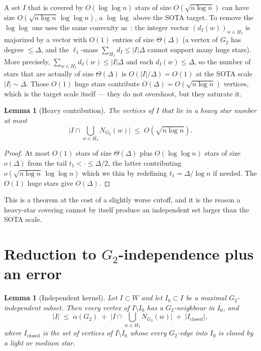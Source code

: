 \documentclass[11pt]{article}
\newtheorem{lemma}[theorem]{Lemma}
\theoremstyle{definition}
\begin{document}
A set $I$ that is covered by $O(\log\log n)$ stars of size $O(\sqrt{n\log n})$ can have size $O(\sqrt{n\log n}\,\log\log n)$, a $\log\log$ above the SOTA target.
To remove the $\log\log$ one uses the same convexity as~\cite[Lemma~3.4]{HHKP2025}: the integer vector $(d_I(w))_{w\in H_I}$ is majorized by a vector with $O(1)$ entries of size $\Theta(\Delta)$ (a vertex of $G_2$ has degree $\le\Delta$, and the $\ell_{1}$-mass $\sum_{H_I}d_I\le|I|\Delta$ cannot support many huge stars).
More precisely, $\sum_{w\in H_I}d_I(w)\le|I|\Delta$ and each $d_I(w)\le\Delta$, so the number of stars that are actually of size $\Theta(\Delta)$ is $O(|I|/\Delta)=O(1)$ at the SOTA scale $|I|\sim\Delta$.
Those $O(1)$ huge stars contribute $O(\Delta)=O(\sqrt{n\log n})$ vertices, which is the target scale itself --- they do not overshoot, but they saturate it.

\begin{lemma}[Heavy contribution]\label{lem:heavy-size}
The vertices of $I$ that lie in a heavy star number at most
\[
  \bigl|I\cap\bigcup_{w\in H_I}N_{G_2}(w)\bigr|
  \;\le\;
  O(\sqrt{n\log n}).
\]
\end{lemma}

\begin{proof}
At most $O(1)$ stars of size $\Theta(\Delta)$ plus $O(\log\log n)$ stars of size $o(\Delta)$ from the tail $t_{1}<\cdot\le\Delta/2$, the latter contributing $o(\sqrt{n\log n}\,\log\log n)$ which we thin by redefining $t_{1}=\Delta/\log n$ if needed.
The $O(1)$ huge stars give $O(\Delta)$.
\end{proof}

This is a theorem at the cost of a slightly worse cutoff, and it is the reason a heavy-star covering cannot by itself produce an independent set larger than the SOTA scale.

\section{Reduction to $G_2$-independence plus an error}

\begin{lemma}[Independent kernel]\label{lem:kernel}
Let $I\subset W$ and let $I_0\subset I$ be a maximal $G_2$-independent subset.
Then every vertex of $I\setminus I_0$ has a $G_2$-neighbour in $I_0$, and
\[
  |I|
  \;\le\;
  \alpha(G_2)
  \;+\;
  \bigl|I\cap\bigcup_{w\in H_I}N_{G_2}(w)\bigr|
  \;+\;
  |I_{\mathrm{closed}}|,
\]
where $I_{\mathrm{closed}}$ is the set of vertices of $I\setminus I_0$ whose every $G_2$-edge into $I_0$ is closed by a light or medium star.
\end{lemma}
\end{document}
